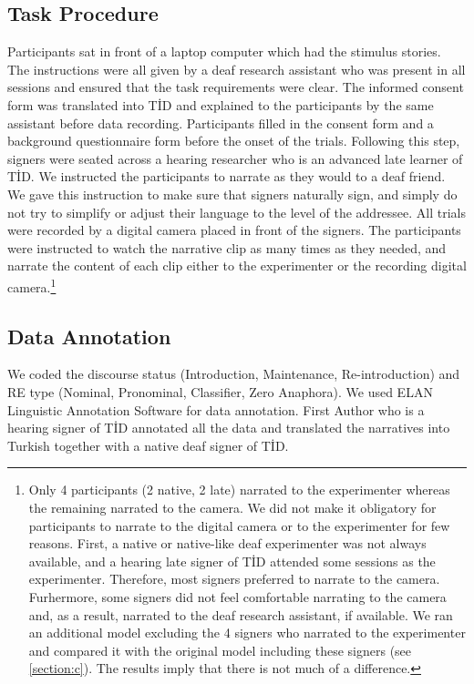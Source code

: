 \documentclass[review]{elsarticle} %
\begin{document}
\hypertarget{task-procedure}{%
\subsection{Task Procedure}\label{task-procedure}}

Participants sat in front of a laptop computer which had the stimulus
stories. The instructions were all given by a deaf research assistant
who was present in all sessions and ensured that the task requirements
were clear. The informed consent form was translated into TİD and
explained to the participants by the same assistant before data
recording. Participants filled in the consent form and a background
questionnaire form before the onset of the trials. Following this step,
signers were seated across a hearing researcher who is an advanced late
learner of TİD. We instructed the participants to narrate as they would
to a deaf friend. We gave this instruction to make sure that signers
naturally sign, and simply do not try to simplify or adjust their
language to the level of the addressee. All trials were recorded by a
digital camera placed in front of the signers. The participants were
instructed to watch the narrative clip as many times as they needed, and
narrate the content of each clip either to the experimenter or the
recording digital
camera.\footnote{Only 4 participants (2 native, 2 late) narrated to the experimenter whereas the remaining narrated to the camera. We did not make it obligatory for participants to  narrate to the digital camera or to the experimenter for few reasons. First, a native or native-like deaf experimenter was not always available, and a hearing late signer of TİD attended some sessions as the experimenter. Therefore, most signers preferred to narrate to the camera. Furhermore, some signers did not feel comfortable narrating to the camera and, as a result, narrated to the deaf research assistant, if available. We ran an additional model excluding the 4 signers who narrated to the experimenter and compared it with the original model including these signers (see \ref{section:c}). The results imply that there is not much of a difference.}

\hypertarget{data-annotation}{%
\subsection{Data Annotation}\label{data-annotation}}

We coded the discourse status (Introduction, Maintenance,
Re-introduction) and RE type (Nominal, Pronominal, Classifier, Zero
Anaphora). We used ELAN Linguistic Annotation Software
\citep{crasborn2008} for data annotation. First Author who is a hearing
signer of TİD annotated all the data and translated the narratives into
Turkish together with a native deaf signer of TİD.
\end{document}
